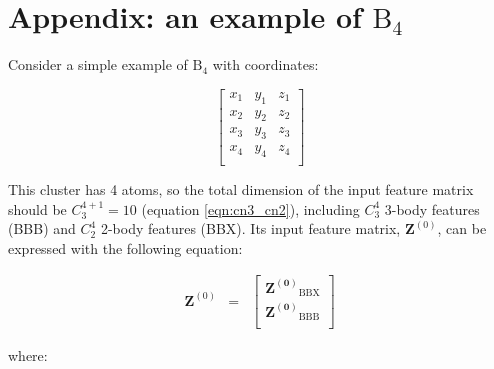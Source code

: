 \section*{Appendix: an example of $\mathrm{B}_4$}

Consider a simple example of $\mathrm{B}_{4}$ with coordinates: 

\begin{equation}
\left[\begin{array}{ccc}
	x_{1} & y_{1} & z_{1} \\
	x_{2} & y_{2} & z_{2} \\
	x_{3} & y_{3} & z_{3} \\
	x_{4} & y_{4} & z_{4} \\
\end{array}
\right]
\end{equation}

\noindent This cluster has 4 atoms, so the total dimension of the input feature matrix 
should be $C^{4+1}_3=10$ (equation \ref{eqn:cn3_cn2}), including $C^4_3$ 3-body features (BBB) and 
$C^4_2$ 2-body features (BBX). Its input feature matrix, $\mathbf{Z}^{(0)}$, can be expressed 
with the following equation:

\begin{eqnarray}
\mathbf{Z}^{(0)} & = & \left[\begin{array}{c}
	\mathbf{Z^{(0)}}_{\mathrm{BBX}} \\
	\mathbf{Z^{(0)}}_{\mathrm{BBB}} \\
\end{array}
\right]
\end{eqnarray}

\noindent where:

